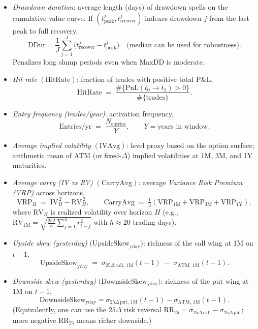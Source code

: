 \documentclass[12pt,a4paper]{report}
\begin{document}
\begin{itemize}
        \item \emph{Drawdown duration}:
        average length (days) of drawdown spells on the cumulative value curve. If $(t_{\text{peak}}^j,t_{\text{recover}}^j)$
        indexes drawdown $j$ from the last peak to full recovery,
        \[
        \mathrm{DDur}=\frac{1}{J}\sum_{j=1}^{J}\big(t_{\text{recover}}^j-t_{\text{peak}}^j\big)
        \quad
        \text{(median can be used for robustness).}
        \]
        Penalizes long slump periods even when MaxDD is moderate.
        \item \emph{Hit rate} $(\mathrm{HitRate})$: fraction of trades with positive total P\&L,
        \[
        \mathrm{HitRate} \;=\; \frac{\#\{\mathrm{PnL}(t_0\!\to\!t_1)>0\}}{\#\{\text{trades}\}}.
        \]
        \item \emph{Entry frequency (trades/year)}: activation frequency,
        \[
        \mathrm{Entries/yr} \;=\; \frac{N_{\text{entries}}}{Y}, \qquad Y=\text{years in window}.
        \]
        \item \emph{Average implied volatility} $(\mathrm{IVAvg})$: level proxy based on the option surface; arithmetic mean of ATM (or fixed-$\Delta$) implied volatilities at 1M, 3M, and 1Y maturities.
        \item \emph{Average carry (IV vs RV)} $(\mathrm{CarryAvg})$: average \emph{Variance Risk Premium (VRP)} across horizons,
        \[
        \mathrm{VRP}_H \;=\; \mathrm{IV}_H^{\,2}-\mathrm{RV}_H^{\,2}, \qquad
        \mathrm{CarryAvg} \;=\; \tfrac{1}{3}\!\left(\mathrm{VRP}_{1\mathrm{M}}+\mathrm{VRP}_{3\mathrm{M}}+\mathrm{VRP}_{1\mathrm{Y}}\right),
        \] 
        where $\mathrm{RV}_H$ is realized volatility over horizon $H$ (e.g., $\mathrm{RV}_{1\mathrm{M}}=\sqrt{\tfrac{252}{h}\sum_{j=1}^{h} r_{t-j}^2}$ with $h\approx 20$ trading days).
        \item \emph{Upside skew (yesterday)} $\big(\mathrm{UpsideSkew}_{\text{yday}}\big)$: richness of the call wing at 1M on $t\!-\!1$,
        \[
        \mathrm{UpsideSkew}_{\text{yday}} \;=\; \sigma_{25\Delta\,\text{call},\,1\mathrm{M}}(t\!-\!1) \;-\; \sigma_{\mathrm{ATM},\,1\mathrm{M}}(t\!-\!1).
        \]
        \item \emph{Downside skew (yesterday)} $\big(\mathrm{DownsideSkew}_{\text{yday}}\big)$:
        richness of the put wing at 1M on $t\!-\!1$,
        \[
        \mathrm{DownsideSkew}_{\text{yday}}=\sigma_{25\Delta\,\text{put},\,1\mathrm{M}}(t\!-\!1)-\sigma_{\mathrm{ATM},\,1\mathrm{M}}(t\!-\!1).
        \]
        (Equivalently, one can use the $25\Delta$ risk reversal $\mathrm{RR}_{25}=\sigma_{25\Delta\,\text{call}}-\sigma_{25\Delta\,\text{put}}$;
        more negative $\mathrm{RR}_{25}$ means richer downside.)
        

\end{itemize}
\end{document}
